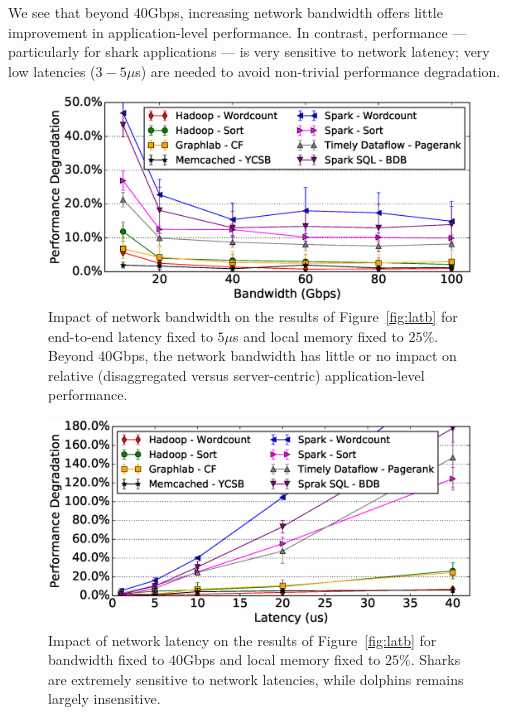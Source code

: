 We see that beyond $40$Gbps, increasing network bandwidth offers little improvement in application-level performance. 
In contrast, performance --- particularly for shark applications --- is very sensitive to network latency; very low latencies ($3-5\mu$s) are needed to avoid non-trivial performance degradation.

%
\begin{figure}
  \centering
    \includegraphics[width = \columnwidth]{img/fix_latency_vary_bw.eps} 
  \caption{\small{Impact of network bandwidth on the results of Figure~\ref{fig:latb} for end-to-end latency fixed to $5\mu$s and local memory fixed to $25\%$. Beyond $40$Gbps, the network bandwidth has little or no impact on relative (disaggregated versus server-centric) application-level performance.}}
  \label{fig:impbw}
\end{figure}
%
%
\begin{figure}
  \centering
    \includegraphics[width=\columnwidth]{img/fix_bw_vary_latency.eps} 
  \caption{\small{Impact of network latency on the results of Figure~\ref{fig:latb} for bandwidth fixed to $40$Gbps and local memory fixed to $25\%$. Sharks are extremely sensitive to network latencies, while dolphins remains largely insensitive.}}
  \label{fig:impl}
\end{figure}
